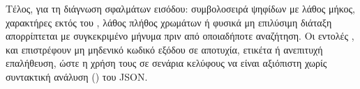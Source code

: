 Τέλος, για τη διάγνωση σφαλμάτων εισόδου: συμβολοσειρά ψηφίδων με λάθος μήκος, χαρακτήρες εκτός του , λάθος πλήθος χρωμάτων ή φυσικά μη επιλύσιμη διάταξη απορρίπτεται με συγκεκριμένο μήνυμα πριν από οποιαδήποτε αναζήτηση. Οι εντολές ,  και  επιστρέφουν μη μηδενικό κωδικό εξόδου σε αποτυχία, ετικέτα  ή ανεπιτυχή επαλήθευση, ώστε η χρήση τους σε σενάρια κελύφους να είναι αξιόπιστη χωρίς συντακτική ανάλυση () του JSON.
